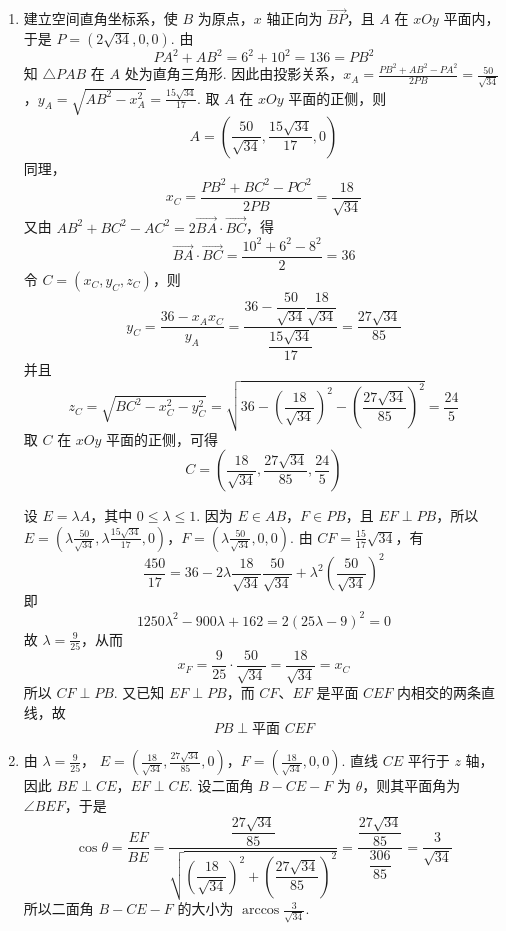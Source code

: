\begin{solution}
\begin{enumerate}
\item
建立空间直角坐标系，使 \(B\) 为原点，\(x\) 轴正向为 \(\overrightarrow{BP}\)，且 \(A\) 在 \(xOy\) 平面内，于是 \(P=(2\sqrt{34},0,0)\). 由
\[
PA^2+AB^2=6^2+10^2=136=PB^2
\]
知 \( \triangle PAB\) 在 \(A\) 处为直角三角形. 因此由投影关系，\(x_A=\frac{PB^2+AB^2-PA^2}{2PB}=\frac{50}{\sqrt{34}}\)，\(y_A=\sqrt{AB^2-x_A^2}=\frac{15\sqrt{34}}{17}\).
取 \(A\) 在 \(xOy\) 平面的正侧，则
\[
A=\left(\frac{50}{\sqrt{34}},\frac{15\sqrt{34}}{17},0\right)
\]
同理，
\[
x_C=\frac{PB^2+BC^2-PC^2}{2PB}=\frac{18}{\sqrt{34}}
\]
又由 \(AB^2+BC^2-AC^2=2\overrightarrow{BA}\cdot\overrightarrow{BC}\)，得
\[
\overrightarrow{BA}\cdot\overrightarrow{BC}=\frac{10^2+6^2-8^2}{2}=36
\]
令 \(C=(x_C,y_C,z_C)\)，则
\[
y_C=\frac{36-x_Ax_C}{y_A}
 =\frac{36-\dfrac{50}{\sqrt{34}}\dfrac{18}{\sqrt{34}}}{\dfrac{15\sqrt{34}}{17}}
 =\frac{27\sqrt{34}}{85}
\]
并且
\[
z_C=\sqrt{BC^2-x_C^2-y_C^2}
 =\sqrt{36-\left(\frac{18}{\sqrt{34}}\right)^2-\left(\frac{27\sqrt{34}}{85}\right)^2}
 =\frac{24}{5}
\]
取 \(C\) 在 \(xOy\) 平面的正侧，可得
\[
C=\left(\frac{18}{\sqrt{34}},\frac{27\sqrt{34}}{85},\frac{24}{5}\right)
\]

设 \(E=\lambda A\)，其中 \(0\leqslant\lambda\leqslant1\). 因为 \(E\in AB\)，\(F\in PB\)，且 \(EF\perp PB\)，所以
\(E=\left(\lambda\frac{50}{\sqrt{34}},\lambda\frac{15\sqrt{34}}{17},0\right)\)，\(F=\left(\lambda\frac{50}{\sqrt{34}},0,0\right)\).
由 \(CF=\frac{15}{17}\sqrt{34}\)，有
\[
\frac{450}{17}=36-2\lambda\frac{18}{\sqrt{34}}\frac{50}{\sqrt{34}}+\lambda^2\left(\frac{50}{\sqrt{34}}\right)^2
\]
即
\[
1250\lambda^2-900\lambda+162=2(25\lambda-9)^2=0
\]
故 \(\lambda=\frac{9}{25}\)，从而
\[
x_F=\frac{9}{25}\cdot\frac{50}{\sqrt{34}}=\frac{18}{\sqrt{34}}=x_C
\]
所以 \(CF\perp PB\). 又已知 \(EF\perp PB\)，而 \(CF\)、\(EF\) 是平面 \(CEF\) 内相交的两条直线，故
\[
PB\perp\text{平面 }CEF
\]

\item
由 \(\lambda=\frac{9}{25}\)，
\(E=\left(\frac{18}{\sqrt{34}},\frac{27\sqrt{34}}{85},0\right)\)，\(F=\left(\frac{18}{\sqrt{34}},0,0\right)\).
直线 \(CE\) 平行于 \(z\) 轴，因此 \(BE\perp CE\)，\(EF\perp CE\). 设二面角 \(B-CE-F\) 为 \(\theta\)，则其平面角为 \(\angle BEF\)，于是
\[
\cos\theta=\frac{EF}{BE}
 =\frac{\dfrac{27\sqrt{34}}{85}}{\sqrt{\left(\dfrac{18}{\sqrt{34}}\right)^2+\left(\dfrac{27\sqrt{34}}{85}\right)^2}}
 =\frac{\dfrac{27\sqrt{34}}{85}}{\dfrac{306}{85}}
 =\frac{3}{\sqrt{34}}
\]
所以二面角 \(B-CE-F\) 的大小为 \(\arccos\frac{3}{\sqrt{34}}\).
\end{enumerate}
\end{solution}

